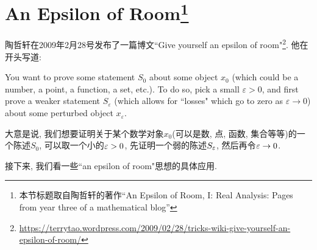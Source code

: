 \section{An Epsilon of Room\footnote{本节标题取自陶哲轩的著作“An Epsilon of Room, I: Real Analysis: Pages from year three of a mathematical blog”}}\label{epsilon_room}
陶哲轩在2009年2月28号发布了一篇博文``Give yourself an epsilon of room"\footnote{\url{https://terrytao.wordpress.com/2009/02/28/tricks-wiki-give-yourself-an-epsilon-of-room/}}. 他在开头写道:

You want to prove some statement $S_0$ about some object $x_0$ (which could be a number, a point, a function, a set, etc.).  To do so, pick a small $\varepsilon > 0$, and first prove a weaker statement $S_\varepsilon$ (which allows for ``losses" which go to zero as $\varepsilon \to 0$) about some perturbed object $x_\varepsilon$.

大意是说, 我们想要证明关于某个数学对象$x_0$(可以是数, 点, 函数, 集合等等)的一个陈述$S_0$, 
可以取一个小的$\varepsilon>0$, 先证明一个弱的陈述$S_\varepsilon$, 然后再令$\varepsilon \to 0$. 

接下来, 我们看一些``an epsilon of room"思想的具体应用.
